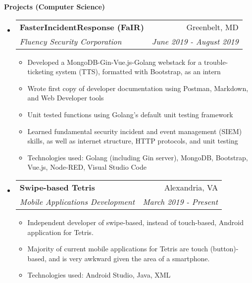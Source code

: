 \documentclass[letterpaper,11pt]{article}
\makeatletter
\newcommand{\resitem}[1]{\item #1 \vspace{-2pt}}
\newcommand{\resheading}[1]{{\large \colorbox{mygrey}{\begin{minipage}{\textwidth}{\textbf{#1 \vphantom{p\^{E}}}}\end{minipage}}}}
\newcommand{\ressubheading}[4]{
\begin{tabular*}{7.0in}{l@{\extracolsep{\fill}}r}
		\textbf{#1} & #2 \\
		\textit{#3} & \textit{#4} \\
\end{tabular*}\vspace{-6pt}}
\makeatother
\begin{document}
\resheading{Projects (Computer Science)}

\begin{itemize}
\item
    \ressubheading{FasterIncidentResponse (FaIR)}{Greenbelt, MD}{Fluency Security Corporation}{June 2019 - August 2019}
	\begin{itemize}
		\resitem{Developed a MongoDB-Gin-Vue.js-Golang webstack for a trouble-ticketing system (TTS), formatted with Bootstrap, as an intern}
		\resitem{Wrote first copy of developer documentation using Postman, Markdown, and Web Developer tools}
		\resitem{Unit tested functions using Golang's default unit testing framework}
		\resitem{Learned fundamental security incident and event management (SIEM) skills, as well as internet structure, HTTP protocols, and unit testing}
		\resitem{Technologies used: Golang (including Gin server), MongoDB, Bootstrap, Vue.js, Node-RED, Visual Studio Code}
	\end{itemize}
\item
    \ressubheading{Swipe-based Tetris}{Alexandria, VA}{Mobile Applications Development}{March 2019 - Present}
	\begin{itemize}
		\resitem{Independent developer of swipe-based, instead of touch-based, Android application for Tetris.}
		\resitem{Majority of current mobile applications for Tetris are touch (button)-based, and is very awkward given the area of a smartphone.}
		\resitem{Technologies used: Android Studio, Java, XML}
	\end{itemize}

\pagebreak


\end{itemize}
\end{document}
